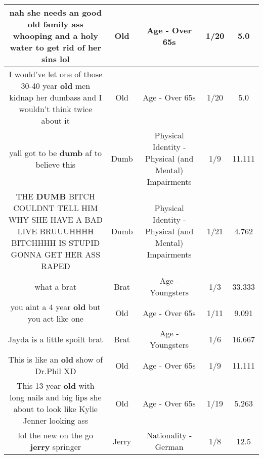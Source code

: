 \documentclass[11pt]{article}
\newlength\mylength
\begin{document}
\begin{center}
\begin{longtable}{|C{.65\mylength}|C{.30\mylength}|C{.12\mylength}|C{.12\mylength}|C{.12\mylength}|}
  \small nah she needs an good \textbf{old} family ass whooping and a holy water to get rid of her sins lol\normalsize   & Old & Age - Over 65s & 1/20 & 5.0 \\  \hline
  \small I would've let one of those 30-40 year \textbf{old} men kidnap her dumbass and I wouldn't think twice about it\normalsize   & Old & Age - Over 65s & 1/20 & 5.0 \\  \hline
  \small yall got to be \textbf{dumb} af to believe this\normalsize   & Dumb & Physical Identity - Physical (and Mental) Impairments & 1/9 & 11.111 \\  \hline
  \small THE \textbf{DUMB} BITCH COULDNT TELL HIM WHY SHE HAVE A BAD LIVE BRUUUHHHH BITCHHHH IS STUPID  GONNA GET HER ASS RAPED\normalsize   & Dumb & Physical Identity - Physical (and Mental) Impairments & 1/21 & 4.762 \\  \hline
  \small what a brat\normalsize   & Brat & Age - Youngsters & 1/3 & 33.333 \\  \hline
  \small you aint a 4 year \textbf{old} but you act like one\normalsize   & Old & Age - Over 65s & 1/11 & 9.091 \\  \hline
  \small Jayda is a little spoilt brat\normalsize   & Brat & Age - Youngsters & 1/6 & 16.667 \\  \hline
  \small This is like an \textbf{old} show of Dr.Phil XD\normalsize   & Old & Age - Over 65s & 1/9 & 11.111 \\  \hline
  \small This 13 year \textbf{old} with long nails and big lips she about to look like Kylie Jenner looking ass\normalsize   & Old & Age - Over 65s & 1/19 & 5.263 \\  \hline
  \small lol the new on the go \textbf{jerry} springer\normalsize   & Jerry & Nationality - German & 1/8 & 12.5 \\  \hline

\end{longtable}
\end{center}
\end{document}

